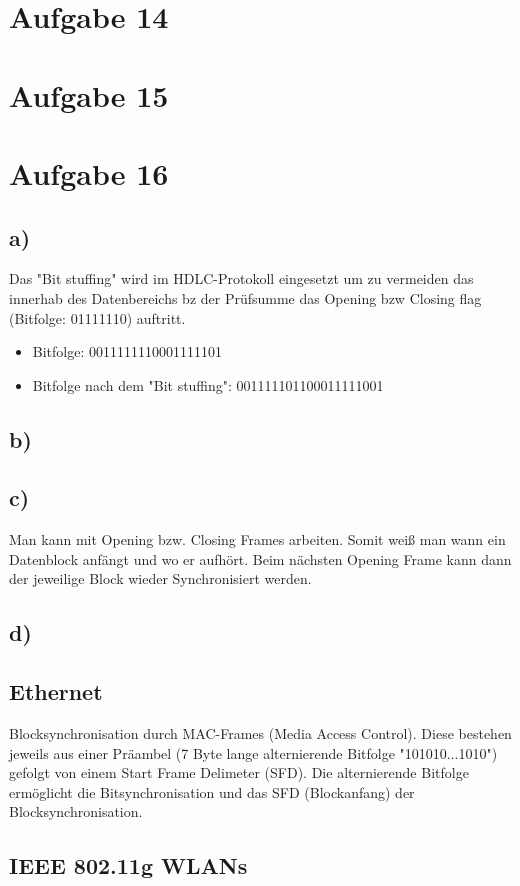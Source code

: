 \documentclass[a4paper,12pt]{scrartcl}
\begin{document}
\section{Aufgabe 14}
\section{Aufgabe 15}
\section{Aufgabe 16}
\subsection{a)}
Das "Bit stuffing" wird im HDLC-Protokoll eingesetzt um zu vermeiden das innerhab des Datenbereichs bz der Prüfsumme das Opening bzw Closing flag (Bitfolge: 01111110) auftritt.
\begin{itemize}
	\item Bitfolge: 0011111110001111101
	\item Bitfolge nach dem "Bit stuffing": 001111101100011111001
\end{itemize}
\subsection{b)}
\subsection{c)}
Man kann mit Opening bzw. Closing Frames arbeiten. Somit weiß man wann ein Datenblock anfängt und wo er aufhört. Beim nächsten Opening Frame kann dann der jeweilige Block wieder Synchronisiert werden.
\subsection{d)}
\subsection{Ethernet}
Blocksynchronisation durch MAC-Frames (Media Access Control). Diese bestehen jeweils aus einer Präambel (7 Byte lange alternierende Bitfolge "101010...1010") gefolgt von einem Start Frame Delimeter (SFD). Die alternierende Bitfolge ermöglicht die Bitsynchronisation und das SFD (Blockanfang) der Blocksynchronisation.
\subsection{IEEE 802.11g WLANs}
\end{document}
